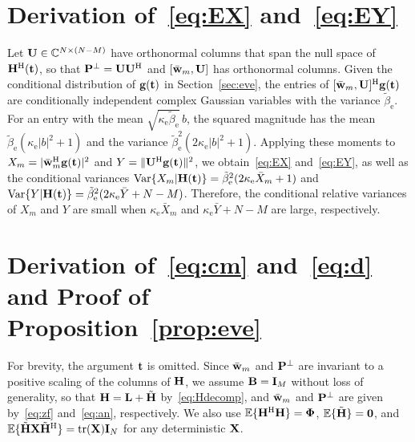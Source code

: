 \documentclass[journal]{IEEEtran}
\newcommand{\rev}[1]{{\color{red}#1}}
\newcommand{\rev}[1]{#1}
\begin{document}
\appendices
\section{Derivation of~\eqref{eq:EX} and~\eqref{eq:EY}}\label{app:indep}
Let $\mathbf{U}\in\mathbb C^{N\times(N-M)}$ have orthonormal columns that span the null space of $\mathbf{H}^{\mathrm H}(\mathbf{t})$, so that $\mathbf{P}^{\perp}=\mathbf{U}\mathbf{U}^{\mathrm H}$ and $[\bar{\mathbf{w}}_m,\mathbf{U}]$ has orthonormal columns. Given the conditional distribution of $\mathbf{g}(\mathbf{t})$ in Section~\ref{sec:eve}, the entries of $[\bar{\mathbf{w}}_m,\mathbf{U}]^{\mathrm H}\mathbf{g}(\mathbf{t})$ are conditionally independent complex Gaussian variables with the variance $\tilde\beta_{\mathrm e}$. For an entry with the mean $\sqrt{\kappa_{\mathrm e}\tilde\beta_{\mathrm e}}\,b$, the squared magnitude has the mean $\tilde\beta_{\mathrm e}(\kappa_{\mathrm e}|b|^2+1)$ and the variance $\tilde\beta_{\mathrm e}^2(2\kappa_{\mathrm e}|b|^2+1)$. Applying these moments to $X_m=|\bar{\mathbf{w}}_m^{\mathrm H}\mathbf{g}(\mathbf{t})|^2$ and $Y=\|\mathbf{U}^{\mathrm H}\mathbf{g}(\mathbf{t})\|^2$, we obtain~\eqref{eq:EX} and~\eqref{eq:EY}, as well as the conditional variances $\mathrm{Var}\{X_m|\mathbf{H}(\mathbf{t})\}=\tilde\beta_{\mathrm e}^2(2\kappa_{\mathrm e}\bar X_m+1)$ and $\mathrm{Var}\{Y|\mathbf{H}(\mathbf{t})\}=\tilde\beta_{\mathrm e}^2(2\kappa_{\mathrm e}\bar Y+N-M)$. Therefore, the conditional relative variances of $X_m$ and $Y$ are small when $\kappa_{\mathrm e}\bar X_m$ and $\kappa_{\mathrm e}\bar Y+N-M$ are large, respectively.

\section{Derivation of~\eqref{eq:cm} and~\eqref{eq:d} and Proof of Proposition~\ref{prop:eve}}\label{app:det}
For brevity, the argument $\mathbf{t}$ is omitted. Since $\bar{\mathbf{w}}_m$ and $\mathbf{P}^{\perp}$ are invariant to \rev{a positive} scaling of the columns of $\mathbf{H}$, we assume $\mathbf{B}=\mathbf{I}_M$ without loss of generality, so that $\mathbf{H}=\mathbf{L}+\tilde{\mathbf{H}}$ by~\eqref{eq:Hdecomp}, and $\bar{\mathbf{w}}_m$ and $\mathbf{P}^{\perp}$ are given by~\eqref{eq:zf} and~\eqref{eq:an}, respectively. We also use $\mathbb{E}\{\mathbf{H}^{\mathrm H}\mathbf{H}\}=\boldsymbol{\Phi}$, $\mathbb{E}\{\tilde{\mathbf{H}}\}=\mathbf 0$, and $\mathbb{E}\{\tilde{\mathbf{H}}\mathbf{X}\tilde{\mathbf{H}}^{\mathrm H}\}=\mathrm{tr}(\mathbf{X})\mathbf{I}_N$ for any deterministic $\mathbf{X}$.
\end{document}
